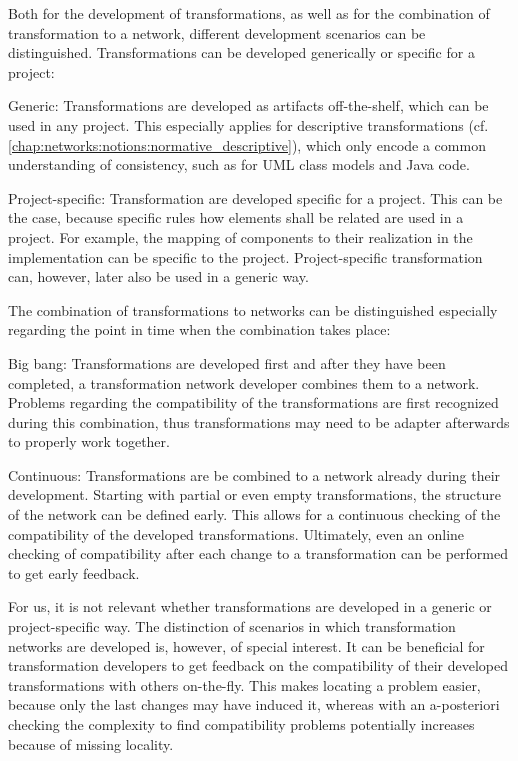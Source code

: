 Both for the development of transformations, as well as for the combination of transformation to a network, different development scenarios can be distinguished.
Transformations can be developed generically or specific for a project:
\begin{properdescription}
    \item[Generic:] Transformations are developed as artifacts off-the-shelf, which can be used in any project. This especially applies for descriptive transformations (cf. \autoref{chap:networks:notions:normative_descriptive}), which only encode a common understanding of consistency, such as for \gls{UML} class models and Java code.
    \item[Project-specific:] Transformation are developed specific for a project. This can be the case, because specific rules how elements shall be related are used in a project. For example, the mapping of components to their realization in the implementation can be specific to the project. Project-specific transformation can, however, later also be used in a generic way.
\end{properdescription}

The combination of transformations to networks can be distinguished especially regarding the point in time when the combination takes place:
\begin{properdescription}
    \item[Big bang:] Transformations are developed first and after they have been completed, a transformation network developer combines them to a network. Problems regarding the compatibility of the transformations are first recognized during this combination, thus transformations may need to be adapter afterwards to properly work together.
    \item[Continuous:] Transformations are be combined to a network already during their development. Starting with partial or even empty transformations, the structure of the network can be defined early. This allows for a continuous checking of the compatibility of the developed transformations. Ultimately, even an online checking of compatibility after each change to a transformation can be performed to get early feedback.
\end{properdescription}

For us, it is not relevant whether transformations are developed in a generic or project-specific way.
The distinction of scenarios in which transformation networks are developed is, however, of special interest.
It can be beneficial for transformation developers to get feedback on the compatibility of their developed transformations with others on-the-fly.
This makes locating a problem easier, because only the last changes may have induced it, whereas with an a-posteriori checking the complexity to find compatibility problems potentially increases because of missing locality.


